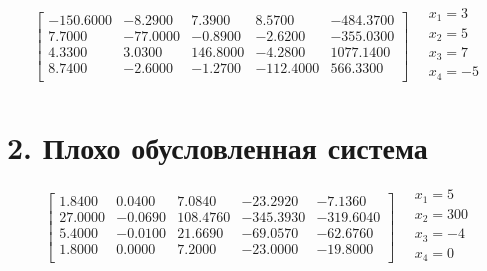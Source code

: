\documentclass[12pt, a4paper]{article}
\begin{document}
\begin{equation*}
\left[
\begin{array}{cccc|c}
 -150.6000 &  -8.2900 &   7.3900 &   8.5700 & -484.3700 \\
    7.7000 & -77.0000 &  -0.8900 &  -2.6200 & -355.0300 \\
    4.3300 &   3.0300 & 146.8000 &  -4.2800 & 1077.1400 \\
    8.7400 &  -2.6000 &  -1.2700 &-112.4000 &  566.3300 \\
\end{array}
\right]
\quad
\begin{array}{c}
x_1 = 3 \\
x_2 = 5 \\
x_3 = 7 \\
x_4 = -5 \\
\end{array}
\end{equation*}

\section*{2. Плохо обусловленная система}

\begin{equation*}
\left[
\begin{array}{cccc|c}
    1.8400 &  0.0400 &   7.0840 & -23.2920 &   -7.1360 \\
   27.0000 & -0.0690 & 108.4760 &-345.3930 & -319.6040 \\
    5.4000 & -0.0100 &  21.6690 & -69.0570 &  -62.6760 \\
    1.8000 &  0.0000 &   7.2000 & -23.0000 &  -19.8000 \\
\end{array}
\right]
\quad
\begin{array}{c}
x_1 = 5 \\
x_2 = 300 \\
x_3 = -4 \\
x_4 = 0 \\

\end{array}
\end{equation*}
\end{document}
